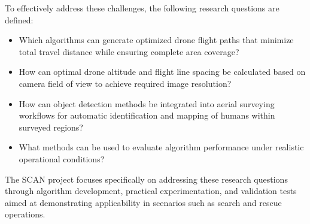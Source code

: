 To effectively address these challenges, the following research questions are defined:

\begin{itemize}
    \item Which algorithms can generate optimized drone flight paths that minimize total travel distance while ensuring complete area coverage?
    \item How can optimal drone altitude and flight line spacing be calculated based on camera field of view to achieve required image resolution?
    \item How can object detection methods be integrated into aerial surveying workflows for automatic identification and mapping of humans within surveyed regions?
    \item What methods can be used to evaluate algorithm performance under realistic operational conditions?
\end{itemize}

The SCAN project focuses specifically on addressing these research questions through algorithm development, practical experimentation, and validation tests aimed at demonstrating applicability in scenarios such as search and rescue operations.

